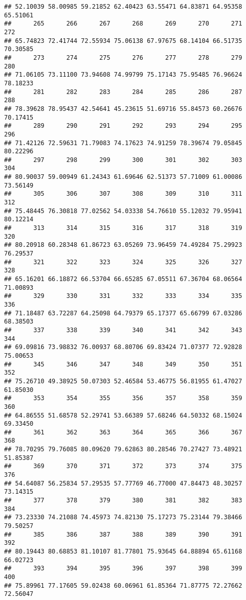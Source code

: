 \documentclass[
]{article}
\begin{document}
\begin{verbatim}
## 52.10039 58.00985 59.21852 62.40423 63.55471 64.83871 64.95358 65.51061 
##      265      266      267      268      269      270      271      272 
## 65.74823 72.41744 72.55934 75.06138 67.97675 68.14104 66.51735 70.30585 
##      273      274      275      276      277      278      279      280 
## 71.06105 73.11100 73.94608 74.99799 75.17143 75.95485 76.96624 78.18233 
##      281      282      283      284      285      286      287      288 
## 78.39628 78.95437 42.54641 45.23615 51.69716 55.84573 60.26676 70.17415 
##      289      290      291      292      293      294      295      296 
## 71.42126 72.59631 71.79083 74.17623 74.91259 78.39674 79.05845 80.22296 
##      297      298      299      300      301      302      303      304 
## 80.90037 59.00949 61.24343 61.69646 62.51373 57.71009 61.00086 73.56149 
##      305      306      307      308      309      310      311      312 
## 75.48445 76.30818 77.02562 54.03338 54.76610 55.12032 79.95941 80.12214 
##      313      314      315      316      317      318      319      320 
## 80.20918 60.28348 61.86723 63.05269 73.96459 74.49284 75.29923 76.29537 
##      321      322      323      324      325      326      327      328 
## 65.16201 66.18872 66.53704 66.65285 67.05511 67.36704 68.06564 71.00893 
##      329      330      331      332      333      334      335      336 
## 71.18487 63.72287 64.25098 64.79379 65.17377 65.66799 67.03286 68.38503 
##      337      338      339      340      341      342      343      344 
## 69.09816 73.98832 76.00937 68.80706 69.83424 71.07377 72.92828 75.00653 
##      345      346      347      348      349      350      351      352 
## 75.26710 49.38925 50.07303 52.46584 53.46775 56.81955 61.47027 61.85030 
##      353      354      355      356      357      358      359      360 
## 64.86555 51.68578 52.29741 53.66389 57.68246 64.50332 68.15024 69.33450 
##      361      362      363      364      365      366      367      368 
## 78.70295 79.76085 80.09620 79.62863 80.28546 70.27427 73.48921 51.85387 
##      369      370      371      372      373      374      375      376 
## 54.64087 56.25834 57.29535 57.77769 46.77000 47.84473 48.30257 73.14315 
##      377      378      379      380      381      382      383      384 
## 73.23330 74.21088 74.45973 74.82130 75.17273 75.23144 79.38466 79.50257 
##      385      386      387      388      389      390      391      392 
## 80.19443 80.68853 81.10107 81.77801 75.93645 64.88894 65.61168 66.02723 
##      393      394      395      396      397      398      399      400 
## 75.89961 77.17605 59.02438 60.06961 61.85364 71.87775 72.27662 72.56047 

\end{verbatim}
\end{document}
